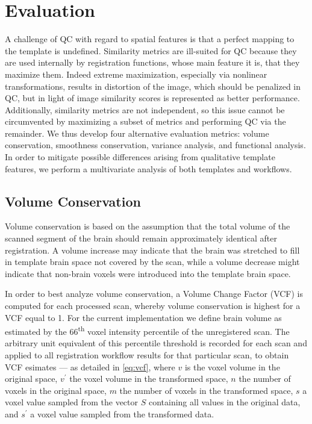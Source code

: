 \section{Evaluation}

A challenge of QC with regard to spatial features is that a perfect mapping to the template is undefined.
Similarity metrics are ill-suited for QC because they are used internally by registration functions, whose main feature it is, that they maximize them.
Indeed extreme maximization, especially via nonlinear transformations, results in distortion of the image, which should be penalized in QC, but in light of image similarity scores is represented as better performance.
Additionally, similarity metrics are not independent, so this issue cannot be circumvented by maximizing a subset of metrics and performing QC via the remainder.
We thus develop four alternative evaluation metrics: volume conservation, smoothness conservation, variance analysis, and functional analysis.
In order to mitigate possible differences arising from qualitative template features, we perform a multivariate analysis of both templates and workflows.


\subsection{Volume Conservation}

Volume conservation is based on the assumption that the total volume of the scanned segment of the brain should remain approximately identical after registration.
A volume increase may indicate that the brain was stretched to fill in template brain space not covered by the scan, while a volume decrease might indicate that non-brain voxels were introduced into the template brain space.

In order to best analyze volume conservation, a Volume Change Factor (VCF) is computed for each processed scan, whereby volume conservation is highest for a VCF equal to 1.
For the current implementation we define brain volume as estimated by the 66\textsuperscript{th} voxel intensity percentile of the unregistered scan.
The arbitrary unit equivalent of this percentile threshold is recorded for each scan and applied to all registration workflow results for that particular scan, to obtain VCF esimates
 --- as detailed in \cref{eq:vcf}, where $v$ is the voxel volume in the original space, $v^\prime$ the voxel volume in the transformed space, $n$ the number of voxels in the original space, $m$ the number of voxels in the transformed space, $s$ a voxel value sampled from the vector $S$ containing all values in the original data, and $s^\prime$ a voxel value sampled from the transformed data.


